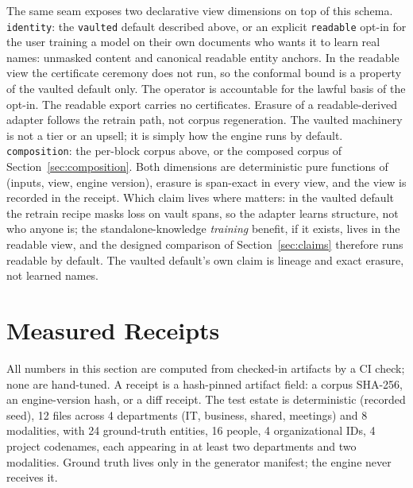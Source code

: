 \documentclass{article}
\begin{document}
The same seam exposes two declarative view dimensions on top of this schema. \texttt{identity}: the \texttt{vaulted} default described above, or an explicit \texttt{readable} opt-in for the user training a model on their own documents who wants it to learn real names: unmasked content and canonical readable entity anchors. In the readable view the certificate ceremony does not run, so the conformal bound is a property of the vaulted default only. The operator is accountable for the lawful basis of the opt-in. The readable export carries no certificates. Erasure of a readable-derived adapter follows the retrain path, not corpus regeneration. The vaulted machinery is not a tier or an upsell; it is simply how the engine runs by default. \texttt{composition}: the per-block corpus above, or the composed corpus of Section~\ref{sec:composition}. Both dimensions are deterministic pure functions of (inputs, view, engine version), erasure is span-exact in every view, and the view is recorded in the receipt. Which claim lives where matters: in the vaulted default the retrain recipe masks loss on vault spans, so the adapter learns structure, not who anyone is; the standalone-knowledge \emph{training} benefit, if it exists, lives in the readable view, and the designed comparison of Section~\ref{sec:claims} therefore runs readable by default. The vaulted default's own claim is lineage and exact erasure, not learned names.

\section{Measured Receipts}
\label{sec:measurements}

All numbers in this section are computed from checked-in artifacts by a CI check; none are hand-tuned. A receipt is a hash-pinned artifact field: a corpus SHA-256, an engine-version hash, or a diff receipt. The test estate is deterministic (recorded seed), 12 files across 4 departments (IT, business, shared, meetings) and 8 modalities, with 24 ground-truth entities, 16 people, 4 organizational IDs, 4 project codenames, each appearing in at least two departments and two modalities. Ground truth lives only in the generator manifest; the engine never receives it.
\end{document}
